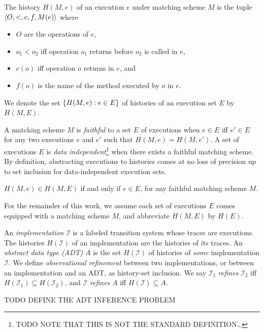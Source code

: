 The history $H(M,e)$ of an execution $e$ under matching scheme $M$ is the tuple
${\left\langle{O,<,c,f,M(e)}\right\rangle}$ where
\begin{itemize}

  \item $O$ are the operations of $e$,

  \item $o_1 < o_2$ if{f} operation $o_1$ returns before $o_2$ is called in $e$,

  \item $c(o)$ if{f} operation $o$ returns in $e$, and

  \item $f(o)$ is the name of the method executed by $o$ in $e$.

\end{itemize}
We denote the set ${\{{H(M,e) : e \in E}\}}$ of histories of an execution set $E$
by $H(M,E)$.

A matching scheme $M$ is \emph{faithful} to a set $E$ of executions when $e \in
E$ if{f} $e' \in E$ for any two executions $e$ and $e'$ such that $H(M,e) =
H(M,e')$. A set of executions $E$ is \emph{data independent}\footnote{TODO NOTE
THAT THIS IS NOT THE STANDARD DEFINITION…} when there exists a faithful
matching scheme. By definition, abstracting executions to histories comes at no
loss of precision up to set inclusion for data-independent execution sets.

\begin{lemma}

  $H(M,e) \in H(M,E)$ if and only if $e \in E$, for any faithful matching
  scheme $M$.

\end{lemma}

For the remainder of this work, we assume each set of executions $E$ comes
equipped with a matching scheme $M$, and abbreviate $H(M,E)$ by $H(E)$.

An \emph{implementation} $\mathcal{I}$ is a labeled transition system whose
traces are executions. The histories $H(\mathcal{I})$ of an implementation are
the histories of its traces. An \emph{abstract data type (ADT)} $A$ is the set
$H(\mathcal{I})$ of histories of \emph{some} implementation $\mathcal{I}$. We
define \emph{observational refinement} between two implementations, or between
an implementation and an ADT, as history-set inclusion. We say $\mathcal{I}_1$
\emph{refines} $\mathcal{I}_2$ if{f} $H(\mathcal{I}_1) \subseteq
H(\mathcal{I}_2)$, and $\mathcal{I}$ \emph{refines} $A$ if{f} $H(\mathcal{I})
\subseteq A$.

TODO DEFINE THE ADT INFERENCE PROBLEM
